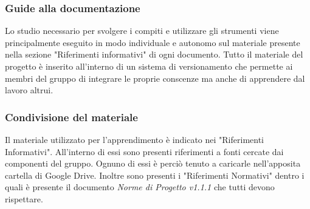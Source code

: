		\subsubsection{Guide alla documentazione}
			Lo studio necessario per svolgere i compiti e utilizzare gli strumenti viene principalmente eseguito in modo individuale e autonomo sul materiale presente nella sezione "Riferimenti informativi" di ogni documento. Tutto il materiale del progetto è inserito all'interno di un sistema di versionamento che permette ai membri del gruppo di integrare le proprie conscenze ma anche di apprendere dal lavoro altrui.
		\subsubsection{Condivisione del materiale}
			Il materiale utilizzato per l'apprendimento è indicato nei "Riferimenti Informativi". All'interno di essi sono presenti riferimenti a fonti cercate dai componenti del gruppo. Ognuno di essi è perciò tenuto a caricarle nell'apposita cartella di Google Drive.
			Inoltre sono presenti i "Riferimenti Normativi" dentro i quali è presente il documento \textit{Norme di Progetto v1.1.1} che tutti devono rispettare.
